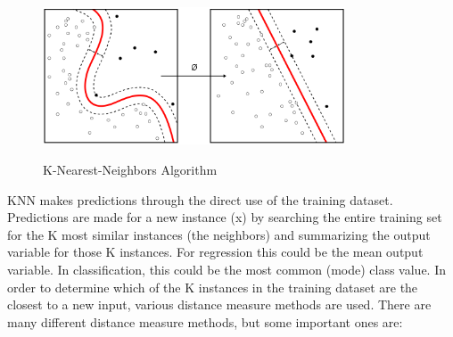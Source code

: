 \begin{figure}[H]
 \centering
  \includegraphics[width=0.8\textwidth]{./Bilder/k-nearest-neighbors.png}\label{Procedures_of_IPM}
  \caption{K-Nearest-Neighbors Algorithm\cite{k_nearest_neighbors_wikipedia}}
\end{figure}

KNN makes predictions through the direct use of the training dataset. Predictions are made for a new instance (x) by searching the entire training set for the K most similar instances (the neighbors) and summarizing the output variable for those K instances. For regression this could be the mean output variable. In classification, this could be the most common (mode) class value. In order to determine which of the K instances in the training dataset are the closest to a new input, various distance measure methods are used. There are many different distance measure methods, but some important ones are:

